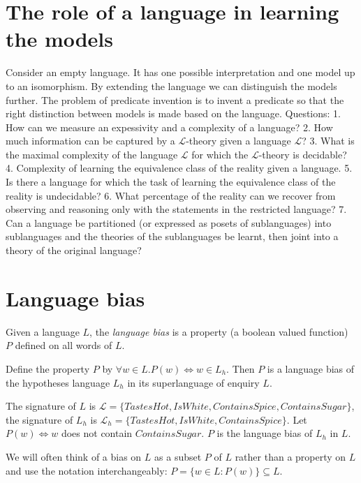 \section{The role of a language in learning the models}
Consider an empty language. It has one possible interpretation and one model up to an isomorphism.
By extending the language we can distinguish the models further. The problem of predicate invention is to invent a predicate so that the right distinction between models is made based on the language.
Questions:
1. How can we measure an expessivity and a complexity of a language?
2. How much information can be captured by a $\mathcal{L}$-theory given a language $\mathcal{L}$?
3. What is the maximal complexity of the language $\mathcal{L}$ for which the $\mathcal{L}$-theory is decidable?
4. Complexity of learning the equivalence class of the reality given a language.
5. Is there a language for which the task of learning the equivalence class of the reality is undecidable?
6. What percentage of the reality can we recover from observing and reasoning only with the statements in the restricted language?
7. Can a language be partitioned (or expressed as posets of sublanguages) into sublanguages and the theories of the sublanguages be learnt, then joint into a theory of the original language?

\section{Language bias}
\begin{defn}
Given a language $L$, the \emph{language bias} is a property (a boolean valued function) $P$ defined on all words of $L$.
\end{defn}

\begin{exmp}
Define the property $P$ by $\forall w \in L. P(w) \iff w \in L_h$. Then $P$ is a language bias of the hypotheses language $L_h$ in its superlanguage of enquiry $L$.
\end{exmp}

\begin{exmp}
The signature of $L$ is
$\mathcal{L}=\{TastesHot, IsWhite, ContainsSpice, ContainsSugar\}$,
the signature of $L_h$ is
$\mathcal{L}_h=\{TastesHot, IsWhite, ContainsSpice\}$.
Let $P(w) \iff w$ does not contain $ContainsSugar$. $P$ is the language bias of $L_h$ in $L$.
\end{exmp}

\begin{remark}
We will often think of a bias on $L$ as a subset $P$ of $L$ rather than a property on $L$ and use the notation interchangeably:
$P=\{w \in L : P(w)\} \subseteq L$.
\end{remark}

